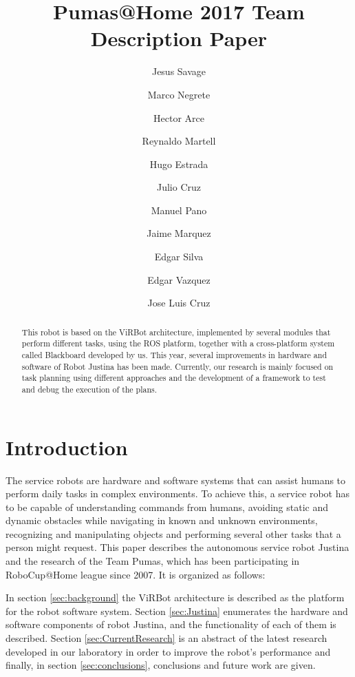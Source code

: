 \documentclass{llncs}
\begin{document}
\title{Pumas@Home 2017 Team Description Paper}
\author{
	Jesus Savage 
	\and Marco Negrete 
	\and Hector Arce 
	\and Reynaldo Martell 
	\and Hugo Estrada 
	\and Julio Cruz 
	\and Manuel Pano 
	\and Jaime Marquez 
	\and Edgar Silva
	\and Edgar Vazquez
	\and Jose Luis Cruz
}
\maketitle


\begin{abstract}
This robot is based on the ViRBot architecture, implemented by several modules that perform different tasks, using the ROS platform, together with a cross-platform system called Blackboard developed by us. This year, several improvements in hardware and software of Robot Justina has been made. Currently, our research is mainly focused on task planning using different approaches and the development of a framework to test and debug the execution of the plans.
\end{abstract}


\section{Introduction}

The service robots are hardware and software systems that can assist humans to perform daily tasks in complex environments. To achieve this, a service robot has to be capable of understanding commands from humans, avoiding static and dynamic obstacles while navigating in known and unknown environments, recognizing and manipulating objects and performing several other tasks that a person might request. This paper describes the autonomous service robot Justina and the research of the Team Pumas, which has been participating in RoboCup@Home league since 2007. It is organized as follows:

In section \ref{sec:background} the ViRBot architecture is described as the platform for the robot software system. Section \ref{sec:Justina} enumerates the hardware and software components of robot Justina, and the functionality of each of them is described. Section \ref{sec:CurrentResearch} is an abstract of the latest research developed in our laboratory in order to improve the robot's performance and finally, in section \ref{sec:conclusions}, conclusions and future work are given.
\end{document}
